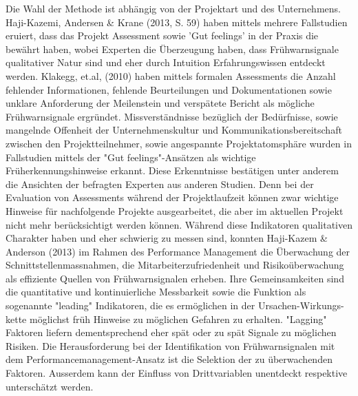 Die Wahl der Methode ist abhängig von der Projektart und des Unternehmens. Haji-Kazemi, Andersen \& Krane (2013, S. 59) haben mittels mehrere Fallstudien eruiert, dass das Projekt Assessment sowie 'Gut feelings' in der Praxis die bewährt haben, wobei Experten die Überzeugung haben, dass Frühwarnsignale qualitativer Natur sind und eher durch Intuition Erfahrungswissen entdeckt werden. Klakegg, et.al, (2010) haben mittels formalen Assessments die Anzahl fehlender Informationen, fehlende Beurteilungen und Dokumentationen sowie unklare Anforderung der Meilenstein und verspätete Bericht als mögliche Frühwarnsignale ergründet. Missverständnisse bezüglich der Bedürfnisse, sowie mangelnde Offenheit der Unternehmenskultur und Kommunikationsbereitschaft zwischen den Projektteilnehmer, sowie angespannte Projektatomsphäre wurden in Fallstudien mittels der "Gut feelings"-Ansätzen als wichtige Früherkennungshinweise erkannt. Diese Erkenntnisse bestätigen unter anderem die Ansichten der befragten Experten aus anderen Studien. Denn bei der Evaluation von Assessments während der Projektlaufzeit können zwar wichtige Hinweise für nachfolgende Projekte ausgearbeitet, die aber im aktuellen Projekt nicht mehr berücksichtigt werden können. Während diese Indikatoren qualitativen Charakter haben und eher schwierig zu messen sind, konnten Haji-Kazem \& Anderson (2013) im Rahmen des Performance Management die Überwachung der Schnittstellenmassnahmen, die Mitarbeiterzufriedenheit und Risikoüberwachung als effiziente Quellen von Frühwarnsignalen erheben. Ihre Gemeinsamkeiten sind die quantitative und kontinuierliche Messbarkeit sowie die Funktion als sogenannte "leading" Indikatoren, die es ermöglichen in der Ursachen-Wirkungs-kette möglichst früh Hinweise zu möglichen Gefahren zu erhalten. "Lagging" Faktoren liefern dementsprechend eher spät oder zu spät Signale zu möglichen Risiken. Die Herausforderung bei der Identifikation von Frühwarnsignalen mit dem Performancemanagement-Ansatz ist die Selektion der zu überwachenden Faktoren. Ausserdem kann der Einfluss von Drittvariablen unentdeckt respektive unterschätzt werden.


